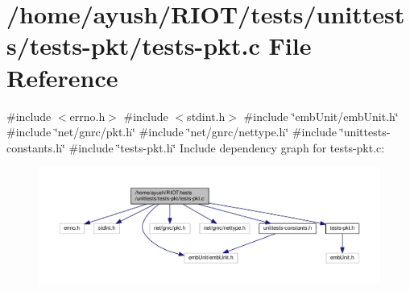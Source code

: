 \hypertarget{tests-pkt_8c}{}\section{/home/ayush/\+R\+I\+O\+T/tests/unittests/tests-\/pkt/tests-\/pkt.c File Reference}
\label{tests-pkt_8c}
{\ttfamily \#include $<$errno.\+h$>$}\newline
{\ttfamily \#include $<$stdint.\+h$>$}\newline
{\ttfamily \#include \char`\"{}emb\+Unit/emb\+Unit.\+h\char`\"{}}\newline
{\ttfamily \#include \char`\"{}net/gnrc/pkt.\+h\char`\"{}}\newline
{\ttfamily \#include \char`\"{}net/gnrc/nettype.\+h\char`\"{}}\newline
{\ttfamily \#include \char`\"{}unittests-\/constants.\+h\char`\"{}}\newline
{\ttfamily \#include \char`\"{}tests-\/pkt.\+h\char`\"{}}\newline
Include dependency graph for tests-\/pkt.c\+:
\nopagebreak
\begin{figure}[H]
\begin{center}
\leavevmode
\includegraphics[width=350pt]{tests-pkt_8c__incl}
\end{center}
\end{figure}
